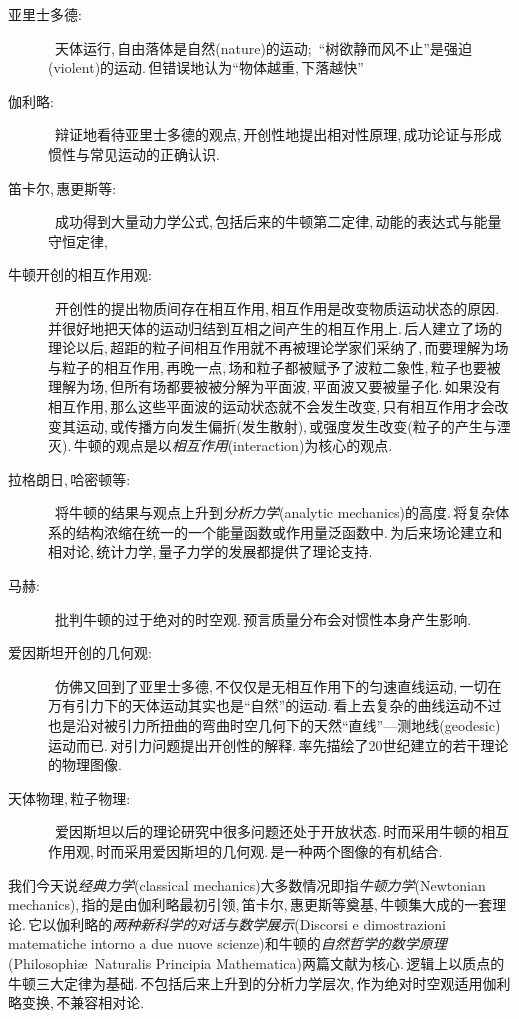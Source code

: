\begin{description}
	\item[亚里士多德:]\, 天体运行,\,自由落体是自然(nature)的运动;\, ``树欲静而风不止''是强迫(violent)的运动.\,但错误地认为``物体越重,\,下落越快''
	\item[伽利略:]\, 辩证地看待亚里士多德的观点,\,开创性地提出相对性原理,\,成功论证与形成惯性与常见运动的正确认识.
	\item[笛卡尔,\,惠更斯等:]\, 成功得到大量动力学公式,\,包括后来的牛顿第二定律,\,动能的表达式与能量守恒定律,
	\item[牛顿开创的相互作用观:] \, 开创性的提出物质间存在相互作用,\,相互作用是改变物质运动状态的原因.\,并很好地把天体的运动归结到互相之间产生的相互作用上.\,后人建立了场的理论以后,\,超距的粒子间相互作用就不再被理论学家们采纳了,\,而要理解为场与粒子的相互作用,\,再晚一点,\,场和粒子都被赋予了波粒二象性,\,粒子也要被理解为场,\,但所有场都要被被分解为平面波,\,平面波又要被量子化.\,如果没有相互作用,\,那么这些平面波的运动状态就不会发生改变,\,只有相互作用才会改变其运动,\,或传播方向发生偏折(发生散射),\,或强度发生改变(粒子的产生与湮灭).\,牛顿的观点是以\emph{相互作用}(interaction)为核心的观点.
	\item[拉格朗日,\,哈密顿等:]\, 将牛顿的结果与观点上升到\emph{分析力学}(analytic mechanics)的高度.\,将复杂体系的结构浓缩在统一的一个能量函数或作用量泛函数中.\,为后来场论建立和相对论,\,统计力学,\,量子力学的发展都提供了理论支持.
	\item[马赫:]\, 批判牛顿的过于绝对的时空观.\,预言质量分布会对惯性本身产生影响.
	\item[爱因斯坦开创的几何观:] \,  仿佛又回到了亚里士多德,\,不仅仅是无相互作用下的匀速直线运动,\,一切在万有引力下的天体运动其实也是``自然''的运动.\,看上去复杂的曲线运动不过也是沿对被引力所扭曲的弯曲时空几何下的天然``直线''---测地线(geodesic)运动而已.\,对引力问题提出开创性的解释.\,率先描绘了20世纪建立的若干理论的物理图像.
	\item[天体物理,\,粒子物理:]\, 爱因斯坦以后的理论研究中很多问题还处于开放状态.\,时而采用牛顿的相互作用观,\,时而采用爱因斯坦的几何观.\,是一种两个图像的有机结合.
\end{description}

我们今天说\emph{经典力学}(classical mechanics)大多数情况即指\emph{牛顿力学}(Newtonian mechanics),\,指的是由伽利略最初引领,\,笛卡尔,\,惠更斯等奠基,\,牛顿集大成的一套理论.\,它以伽利略的\emph{两种新科学的对话与数学展示}(Discorsi e dimostrazioni matematiche intorno a due nuove scienze)和牛顿的\emph{自然哲学的数学原理}(Philosophi\ae\ Naturalis Principia Mathematica)两篇文献为核心.\,逻辑上以质点的牛顿三大定律为基础.\,不包括后来上升到的分析力学层次,\,作为绝对时空观适用伽利略变换,\,不兼容相对论.

